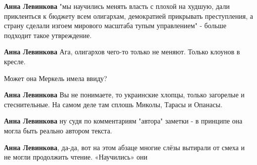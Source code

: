 \begin{itemize}
\begin{itemize}
\textbf{Анна Левинкова} "мы научились менять власть с плохой на худшую, дали приклеиться к бюджету всем олигархам, демократией прикрывать преступления, а страну сделали изгоем мирового масштаба тупым управлением" - больше подходит такое утвреждение.

 
\textbf{Анна Левинкова} Ага, олигархов чего-то только не меняют. Только клоунов в кресле.

 
Может она Меркель имела ввиду?

 
\textbf{Анна Левинкова} Вы не понимаете, то украинские хлопцы, только загорелые и стеснительные. На самом деле там сплошь Миколы, Тарасы и Опанасы.

 
\textbf{Анна Левинкова} ну судя по комментариям "автора" заметки - в принципе она могла быть реально автором текста.

 
\textbf{Анна Левинкова}, да-да, вот на этом абзаце многие слёзы вытирали от смеха и не могли продолжить чтение. «Научились» они🤣
\end{itemize}

\end{itemize}

